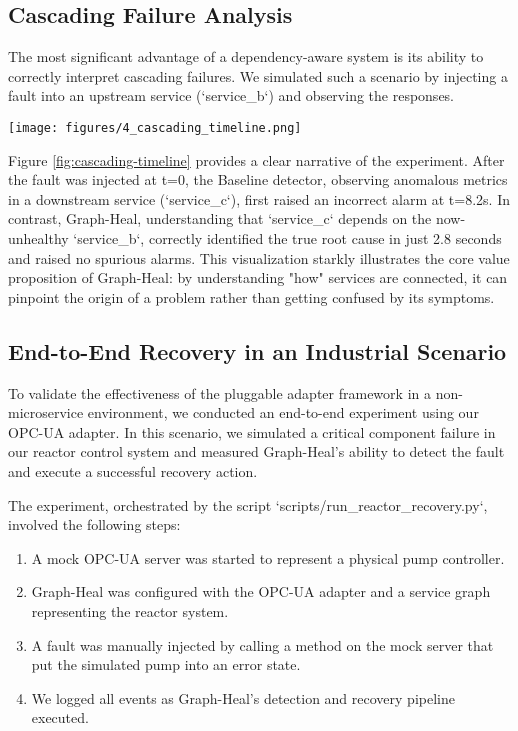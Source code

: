 \documentclass[11pt,conference]{IEEEtran}
\begin{document}
\subsection{Cascading Failure Analysis}
The most significant advantage of a dependency-aware system is its ability to correctly interpret cascading failures. We simulated such a scenario by injecting a fault into an upstream service (`service\_b`) and observing the responses.

\begin{figure*}[ht]
  \centering
  \texttt{[image: figures/4\_cascading\_timeline.png]}
  \caption{Timeline of events during the cascading failure scenario. The Baseline detector incorrectly flags a downstream service before the root cause, while Graph-Heal immediately and correctly identifies the source of the fault.}
  \label{fig:cascading-timeline}
\end{figure*}

Figure \ref{fig:cascading-timeline} provides a clear narrative of the experiment. After the fault was injected at t=0, the Baseline detector, observing anomalous metrics in a downstream service (`service\_c`), first raised an incorrect alarm at t=8.2s. In contrast, Graph-Heal, understanding that `service\_c` depends on the now-unhealthy `service\_b`, correctly identified the true root cause in just 2.8 seconds and raised no spurious alarms. This visualization starkly illustrates the core value proposition of Graph-Heal: by understanding "how" services are connected, it can pinpoint the origin of a problem rather than getting confused by its symptoms.

\subsection{End-to-End Recovery in an Industrial Scenario}
To validate the effectiveness of the pluggable adapter framework in a non-microservice environment, we conducted an end-to-end experiment using our OPC-UA adapter. In this scenario, we simulated a critical component failure in our reactor control system and measured Graph-Heal's ability to detect the fault and execute a successful recovery action.

The experiment, orchestrated by the script `scripts/run_reactor_recovery.py`, involved the following steps:
\begin{enumerate}
    \item A mock OPC-UA server was started to represent a physical pump controller.
    \item Graph-Heal was configured with the OPC-UA adapter and a service graph representing the reactor system.
    \item A fault was manually injected by calling a method on the mock server that put the simulated pump into an error state.
    \item We logged all events as Graph-Heal's detection and recovery pipeline executed.
\end{enumerate}
\end{document}

